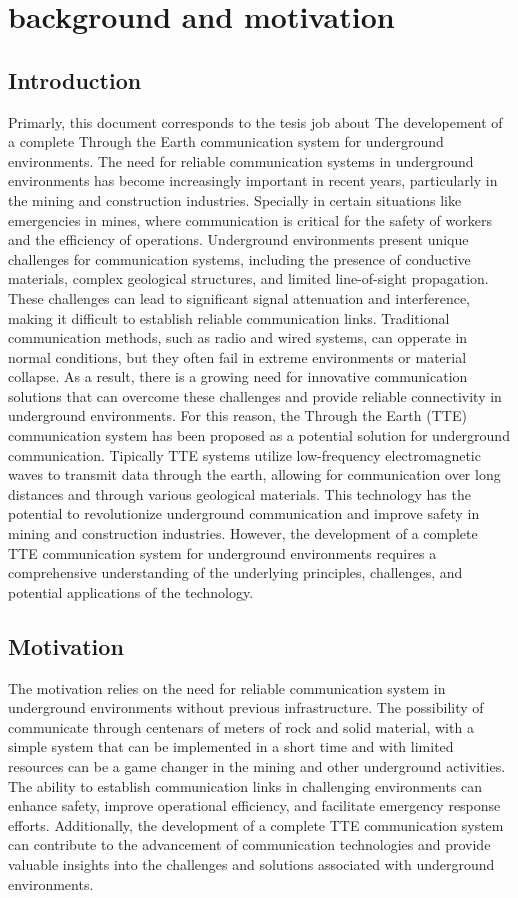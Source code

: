 \chapter{background and motivation}
\section{Introduction}

Primarly, this document corresponds to the tesis job about The developement of a complete Through the Earth communication system for underground environments. The need for reliable communication systems in underground environments has become increasingly important in recent years, particularly in the mining and construction industries. Specially in certain situations like emergencies in mines, where communication is critical for the safety of workers and the efficiency of operations. Underground environments present unique challenges for communication systems, including the presence of conductive materials, complex geological structures, and limited line-of-sight propagation. These challenges can lead to significant signal attenuation and interference, making it difficult to establish reliable communication links. Traditional communication methods, such as radio and wired systems, can opperate in normal conditions, but they often fail in extreme environments or material collapse. As a result, there is a growing need for innovative communication solutions that can overcome these challenges and provide reliable connectivity in underground environments.
For this reason, the Through the Earth (TTE) communication system has been proposed as a potential solution for underground communication. Tipically TTE systems utilize low-frequency electromagnetic waves to transmit data through the earth, allowing for communication over long distances and through various geological materials. This technology has the potential to revolutionize underground communication and improve safety in mining and construction industries. However, the development of a complete TTE communication system for underground environments requires a comprehensive understanding of the underlying principles, challenges, and potential applications of the technology.

\section{Motivation}
The motivation relies on the need for reliable communication system in underground environments without previous infrastructure. The possibility of communicate through centenars of meters of rock and solid material, with a simple system that can be implemented in a short time and with limited resources can be a game changer in the mining and other underground activities.  The ability to establish communication links in challenging environments can enhance safety, improve operational efficiency, and facilitate emergency response efforts. Additionally, the development of a complete TTE communication system can contribute to the advancement of communication technologies and provide valuable insights into the challenges and solutions associated with underground environments.
